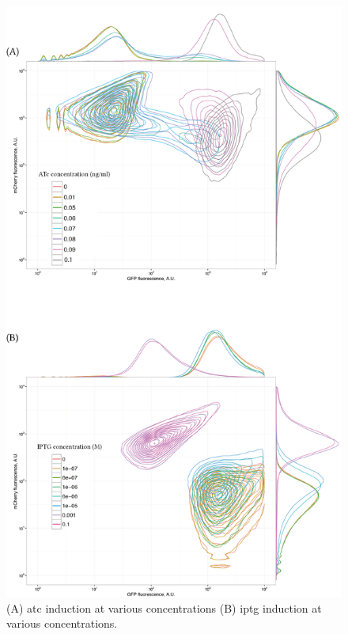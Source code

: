 \begin{figure}[htbp]
	\begin{center}
\includegraphics[scale=0.7]{../../chapters/chapterABCFlow/images/pKDL071_concentrations_2d1d.png}
\caption[Inducer concentration assay of pKDL071]{\label{fig:switch_concent2d1d}(A) \acrshort{atc} induction at various concentrations (B) \acrshort{iptg} induction at various concentrations. }
\end{center}
\end{figure}


